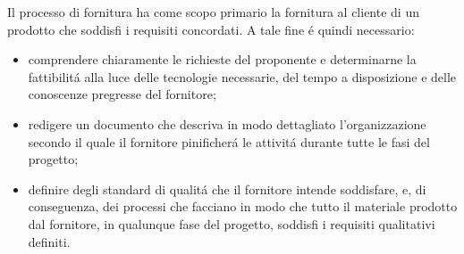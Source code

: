 
Il processo di fornitura ha come scopo primario la fornitura al cliente di un prodotto che soddisfi i 
requisiti concordati. A tale fine \'e quindi necessario:

\begin{itemize}
    \item comprendere chiaramente le richieste del proponente e determinarne la fattibilit\'a alla luce delle tecnologie necessarie, del tempo a disposizione e delle conoscenze pregresse del fornitore;
    \item redigere un documento che descriva in modo dettagliato l'organizzazione secondo il quale il fornitore pinificher\'a le attivit\'a durante tutte le fasi del progetto; %
    \item definire degli standard di qualit\'a che il fornitore intende soddisfare, e, di conseguenza, dei processi che facciano in modo che tutto il materiale prodotto dal fornitore, in qualunque fase del progetto, soddisfi i requisiti qualitativi definiti.
\end{itemize}